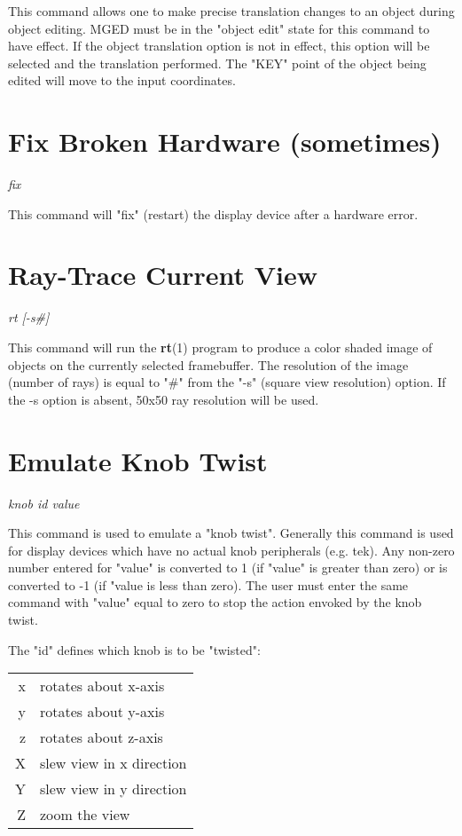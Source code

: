 This command allows one to make precise translation changes to an object
during object editing.
MGED must be in the "object edit" state for this command to have effect.
If the object translation option is not in effect, this option will be
selected and the translation performed.
The "KEY" point of the object being edited will move to the input coordinates.

\section{Fix Broken Hardware (sometimes)}

{\em \center
fix
}

This command will "fix" (restart) the display device after a hardware error.

\section{Ray-Trace Current View}

{\em \center
rt [-s\#]
}

This command will run the {\bf rt}(1) program
to produce a color shaded image of objects on the currently
selected framebuffer.
The resolution of the image (number of rays) is equal to "\#" from the "-s"
(square view resolution) option.
If the -s option is absent, 50x50 ray resolution will be used.

\section{Emulate Knob Twist}

{\em \center
knob id value
}

This command is used to emulate a "knob twist".
Generally this command is used for display devices which have no actual
knob peripherals (e.g. tek).
Any non-zero number entered for "value" is converted to 1 (if "value" is
greater than zero) or is converted to -1 (if "value is less than zero).
The user must enter the same command with "value" equal to zero to
stop the action envoked by the knob twist.

The "id" defines which knob is to be "twisted":

\begin{tabular}{rl}
	x	& rotates about x-axis \\
	y	& rotates about y-axis \\
	z	& rotates about z-axis \\
	X	& slew view in x direction \\
	Y	& slew view in y direction \\
	Z	& zoom the view \\
\end{tabular}

